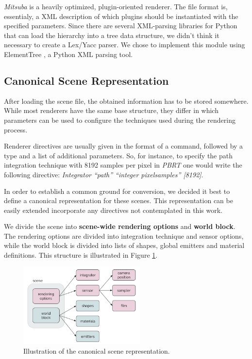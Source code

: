 \textit{Mitsuba} is a heavily optimized, plugin-oriented renderer. The file 
format is, essentialy, a XML description of which plugins should be instantiated 
with the specified parameters. Since there are several 
XML-parsing libraries for Python that can load the hierarchy into a tree data 
structure, we didn't think it necessary to create a Lex/Yacc parser. We chose to 
implement this module using ElementTree \cite{ET}, a Python XML parsing tool.

\subsection{Canonical Scene Representation}
After loading the scene file, the obtained information has to be 
stored somewhere. While most renderers have the same base structure, they differ 
in which parameters can be used to configure the techniques used during the 
rendering process. 

Renderer directives are usually given in the format of a command, followed by a 
type and a list of additional parameters. So, for instance, to specify the path 
integration technique with 8192 samples per pixel in \textit{PBRT} one would 
write the following directive: \textit{Integrator ``path'' ``integer 
pixelsamples'' [8192]}.

In order to establish a common ground for conversion, we decided it best to 
define a canonical representation for these scenes. This representation can be 
easily extended incorporate any directives not contemplated in this work.

We divide the scene into \textbf{scene-wide rendering options} and \textbf{world 
block}. The rendering options are divided into integration technique and sensor 
options, while the world block is divided into lists of shapes, global emitters 
and material definitions. This structure is illustrated in Figure 
\ref{fig:canonicalrep}.

\begin{figure}[h]
\centering
\includegraphics[width=2.5in]{figs/3_system_architecture/canonicalrep.png}
\caption{Illustration of the canonical scene representation.}
\label{fig:canonicalrep}
\end{figure}

